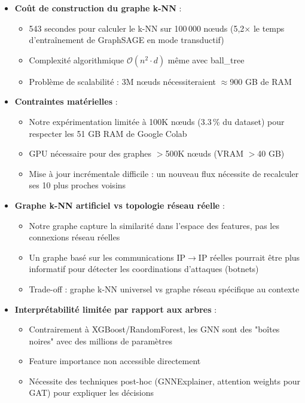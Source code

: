 ﻿\documentclass[11pt,a4paper]{article}
\begin{document}
\begin{itemize}
    \item \textbf{Coût de construction du graphe k-NN} : 
    \begin{itemize}
        \item 543 secondes pour calculer le k-NN sur 100\,000 nœuds (5,2$\times$ le temps d'entraînement de GraphSAGE en mode transductif)
        \item Complexité algorithmique $\mathcal{O}(n^2 \cdot d)$ même avec ball\_tree
        \item Problème de scalabilité : 3M nœuds nécessiteraient $\approx$900 GB de RAM
    \end{itemize}
    
    \item \textbf{Contraintes matérielles} :
    \begin{itemize}
        \item Notre expérimentation limitée à 100K nœuds (3.3\,\% du dataset) pour respecter les 51 GB RAM de Google Colab
        \item GPU nécessaire pour des graphes $>$500K nœuds (VRAM $>$40 GB)
        \item Mise à jour incrémentale difficile : un nouveau flux nécessite de recalculer ses 10 plus proches voisins
    \end{itemize}
    
    \item \textbf{Graphe k-NN artificiel vs topologie réseau réelle} :
\begin{itemize}
        \item Notre graphe capture la similarité dans l'espace des features, pas les connexions réseau réelles
        \item Un graphe basé sur les communications IP$\rightarrow$IP réelles pourrait être plus informatif pour détecter les coordinations d'attaques (botnets)
        \item Trade-off : graphe k-NN universel vs graphe réseau spécifique au contexte
\end{itemize}

    \item \textbf{Interprétabilité limitée par rapport aux arbres} :
\begin{itemize}
        \item Contrairement à XGBoost/RandomForest, les GNN sont des "boîtes noires" avec des millions de paramètres
        \item Feature importance non accessible directement
        \item Nécessite des techniques post-hoc (GNNExplainer, attention weights pour GAT) pour expliquer les décisions
\end{itemize}


\end{itemize}
\end{document}
